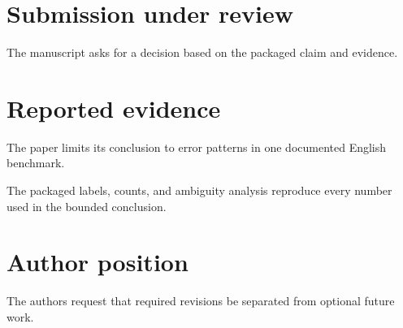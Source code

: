 \documentclass{article}
\begin{document}
\section{Submission under review}
The manuscript asks for a decision based on the packaged claim and evidence.
\section{Reported evidence}
The paper limits its conclusion to error patterns in one documented English benchmark.

The packaged labels, counts, and ambiguity analysis reproduce every number used in the bounded conclusion.
\section{Author position}
The authors request that required revisions be separated from optional future work.
\end{document}
